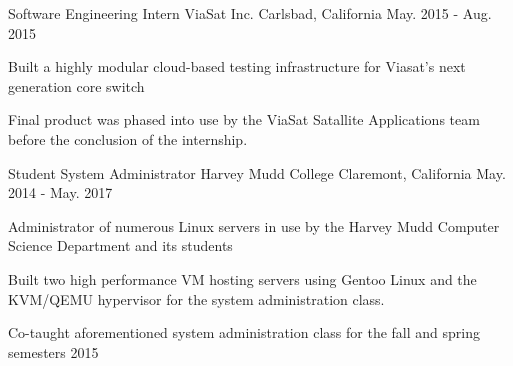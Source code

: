 \begin{cventries}
%
  \cventry
    {Software Engineering Intern} %
    {
      ViaSat Inc.
    } %
    {Carlsbad, California} %
    {May. 2015 - Aug. 2015} %
    {
      \begin{cvitems} %
        \item {Built a highly modular cloud-based testing infrastructure for Viasat's next generation core switch}
        \item {
          Final product was phased into use by the ViaSat Satallite Applications
          team before the conclusion of the internship.
        }
      \end{cvitems}
    }

  \cventry
    {Student System Administrator} %
    {
      \hspace{0.7em}
      Harvey Mudd College
    } %
    {Claremont, California} %
    {May. 2014 - May. 2017} %
    {
      \begin{cvitems} %
        \item {Administrator of numerous Linux servers in use by the Harvey Mudd Computer Science Department and its students}
        \item {
          Built two high performance VM hosting servers using Gentoo Linux and
          the KVM/QEMU hypervisor for the system administration class.
        }
        \item{Co-taught aforementioned system administration class for the fall and spring semesters 2015}
      \end{cvitems}
    }

\end{cventries}
